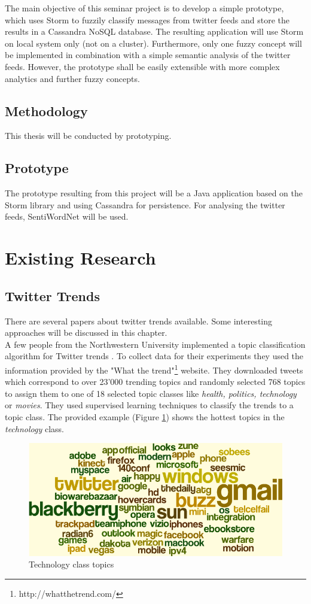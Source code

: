 \documentclass[a4paper]{article}
\begin{document}
The main objective of this seminar project is to develop a simple prototype, which uses Storm to fuzzily classify messages from twitter feeds and store the results in a Cassandra NoSQL database.
The resulting application will use Storm on local system only (not on a cluster). Furthermore, only one fuzzy concept will be implemented in combination with a simple semantic analysis of the twitter feeds. However, the prototype shall be easily extensible with more complex analytics and further fuzzy concepts.


\subsection{Methodology}
This thesis will be conducted by prototyping. 
\subsection{Prototype}
The prototype resulting from this project will be a Java application based on the Storm library and using Cassandra for persistence. For analysing the twitter feeds, SentiWordNet will be used. 

\section{Existing Research}
\subsection{Twitter Trends}
There are several papers about twitter trends available. Some interesting approaches will be discussed in this chapter.\\

A few people from the Northwestern University implemented a topic classification algorithm for Twitter trends \cite{leeEtAl2011}. To collect data for their experiments they used the information provided by the "What the trend"\footnote{http://whatthetrend.com/} website. They downloaded tweets which correspond to over 23'000 trending topics and randomly selected 768 topics to assign them to one of 18 selected topic classes like \textit{health, politics, technology} or \textit{movies}. They used supervised learning techniques to classify the trends to a topic class. The provided example (Figure \ref{techClass}) shows the hottest topics in the \textit{technology} class.
\begin{figure}[h!]
	\centering
	\includegraphics[scale=0.35]{images/technologyClass.png}
	\caption{Technology class topics}
	\label{techClass}
\end{figure}
\end{document}
